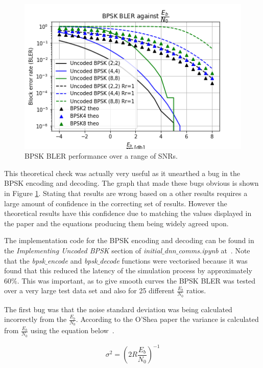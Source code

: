 \documentclass[12pt,onecolumn,letterpaper]{article}
\newcommand{\code}{\textit}
\begin{document}
\begin{figure}[t]
   \centering
   \includegraphics[width=0.6\linewidth]{figures/bpsk_theo_Rr1_and_original.png}
   \caption{BPSK BLER performance over a range of SNRs.}
   \label{fig:BspkBlerComp}
\end{figure}

This theoretical check was actually very useful as it unearthed a bug in the BPSK encoding and decoding. The graph that made these bugs obvious is shown in Figure \ref{fig:BspkBlerComp}. Stating that results are wrong based on a other results requires a large amount of confidence in the correcting set of results. However the theoretical results have this confidence due to matching the values displayed in the paper and the equations producing them being widely agreed upon.

The implementation code for the BPSK encoding and decoding can be found in the \textit{Implementing Uncoded BPSK} section of \code{initial$\_$dnn$\_$comms.ipynb} at~\cite{AwGithub}. Note that the \code{bpsk$\_$encode} and \code{bpsk$\_$decode} functions were vectorised because it was found that this reduced the latency of the simulation process by approximately $60\%$. This was important, as to give smooth curves the BPSK BLER was tested over a very large test data set and also for 25 different $\frac{E_b}{N_0}$ ratios.

The first bug was that the noise standard deviation was being calculated incorrectly from the $\frac{E_b}{N_0}$. According to the O'Shea paper the variance is calculated from $\frac{E_b}{N_0}$ using the equation below~\cite{oShea}.

\begin{equation}
   \sigma^2 = \left(2R\frac{E_b}{N_0} \right)^{-1}
   \label{eq:SigmaFromEbN0}
\end{equation}
\end{document}
